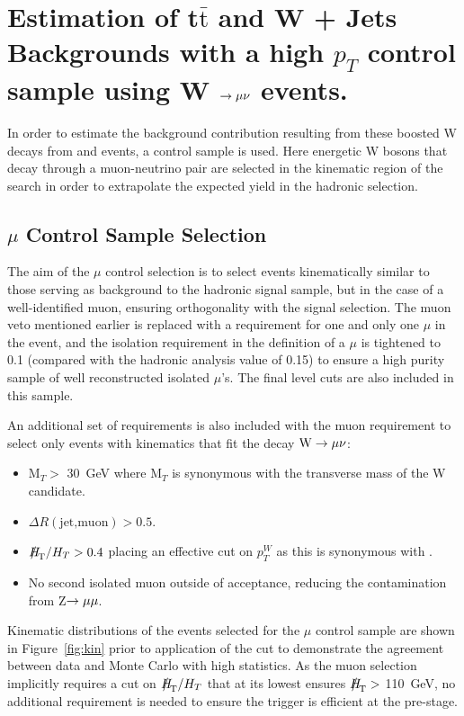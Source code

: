 \section{Estimation of t$\bar{\textrm{t}}$ and W + Jets Backgrounds with a high $p_{T}$ control sample using W $\rightarrow \mu \nu$ events.}

In order to estimate the background contribution resulting from these boosted W decays from \wj and \ttj events, a control sample is used. Here energetic W bosons that decay through a muon-neutrino pair are selected in the kinematic region of the search in order to extrapolate the expected yield in the hadronic selection. 
\subsection{$\mu$ Control Sample Selection}

The aim of the $\mu$ control selection is to select events kinematically similar to those serving as background to the hadronic signal sample, but in the case of a well-identified muon, ensuring orthogonality with the signal selection. The muon veto mentioned earlier is replaced with a requirement for one and only one $\mu$ in the event, and the isolation requirement in the definition of a $\mu$ is tightened to 0.1 (compared with the hadronic analysis value of 0.15) to ensure a high purity sample of well reconstructed isolated $\mu$'s. The final level cuts are also included in this sample.

An additional set of requirements is also included with the muon requirement to select only events with kinematics that fit the decay $\textrm{W} \rightarrow \mu \nu$:
\begin{itemize}
\item M$_{T} >$ 30~GeV where M$_{T}$ is synonymous with the transverse mass of the W candidate.
\item $\Delta R(\textrm{jet,muon}) > 0.5$.
\item $\MHT / \HT > 0.4$ placing an effective cut on $p_{T}^{W}$ as this is synonymous with \MHT.
\item No second isolated muon outside of acceptance, reducing the contamination from Z$ \rightarrow \mu \mu$.
\end{itemize}

Kinematic distributions of the events selected for the $\mu$ control sample are shown in Figure~\ref{fig:kin} prior to application of the \alt cut to demonstrate the agreement between data and Monte Carlo with high statistics. As the muon selection implicitly requires a cut on $\MHT / \HT$ that at its lowest ensures $\MHT >$ 110~GeV, no additional requirement is needed to ensure the trigger is efficient at the pre-\alt stage. 

